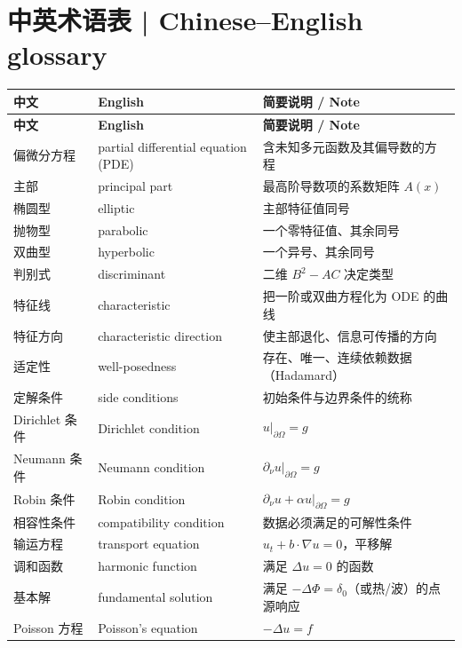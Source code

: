 \documentclass[UTF8,11pt,a4paper]{ctexart}
\begin{document}
\section*{中英术语表 | Chinese--English glossary}
\noindent\small
\begin{longtable}{@{}>{\raggedright\arraybackslash}p{3.0cm}>{\raggedright\arraybackslash}p{5.0cm}>{\raggedright\arraybackslash}p{6.4cm}@{}}
\hline
\textbf{中文} & \textbf{English} & \textbf{简要说明 / Note} \\
\hline
\endfirsthead
\hline
\textbf{中文} & \textbf{English} & \textbf{简要说明 / Note} \\
\hline
\endhead
偏微分方程 & partial differential equation (PDE) & 含未知多元函数及其偏导数的方程 \\
\hline
主部 & principal part & 最高阶导数项的系数矩阵 $A(x)$ \\
\hline
椭圆型 & elliptic & 主部特征值同号 \\
\hline
抛物型 & parabolic & 一个零特征值、其余同号 \\
\hline
双曲型 & hyperbolic & 一个异号、其余同号 \\
\hline
判别式 & discriminant & 二维 $B^2-AC$ 决定类型 \\
\hline
特征线 & characteristic & 把一阶或双曲方程化为 ODE 的曲线 \\
\hline
特征方向 & characteristic direction & 使主部退化、信息可传播的方向 \\
\hline
适定性 & well-posedness & 存在、唯一、连续依赖数据（Hadamard） \\
\hline
定解条件 & side conditions & 初始条件与边界条件的统称 \\
\hline
Dirichlet 条件 & Dirichlet condition & $u|_{\partial\Omega}=g$ \\
\hline
Neumann 条件 & Neumann condition & $\partial_\nu u|_{\partial\Omega}=g$ \\
\hline
Robin 条件 & Robin condition & $\partial_\nu u+\alpha u|_{\partial\Omega}=g$ \\
\hline
相容性条件 & compatibility condition & 数据必须满足的可解性条件 \\
\hline
输运方程 & transport equation & $u_t+b\cdot\nabla u=0$，平移解 \\
\hline
调和函数 & harmonic function & 满足 $\Delta u=0$ 的函数 \\
\hline
基本解 & fundamental solution & 满足 $-\Delta\Phi=\delta_0$（或热/波）的点源响应 \\
\hline
Poisson 方程 & Poisson's equation & $-\Delta u=f$ \\

\end{longtable}
\end{document}
